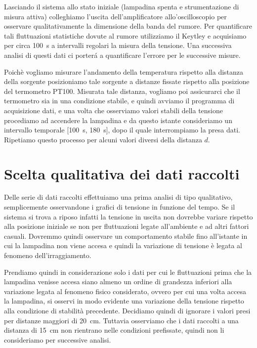 \documentclass[
    rmp,
    reprint, 
    superscriptaddress, 
    altaffilletter, 
    amsmath, 
    amssymb,
    a4paper]{revtex4-2}
\begin{document}
Lasciando il sistema allo stato iniziale (lampadina spenta e strumentazione di misura attiva) colleghiamo l'uscita dell'amplificatore allo'oscilloscopio per osservare qualitativamente la dimensione della banda del rumore. 
Per quantificare tali fluttuazioni statistiche dovute al rumore utilizziamo il Keytley e acquisiamo per circa \SI{100}{\second} a intervalli regolari la misura della tensione. Una successiva analisi di questi dati ci porter\'a a quantificare l'errore per le successive misure.

Poichè vogliamo misurare l'andamento della temperatura rispetto alla distanza della sorgente posizioniamo tale sorgente a distanze fissate rispetto alla posizione del termometro PT100. Misurata tale distanza, vogliamo poi assicurarci che il termometro sia in una condizione stabile, e quindi avviamo il programma di acquisizione dati, e una volta che osserviamo valori stabili della tensione procediamo ad accendere la lampadina e da questo istante consideriamo un intervallo temporale [\SI{100}{\second}, \SI{180}{\second}], dopo il quale interrompiamo la presa dati. Ripetiamo questo processo per alcuni valori diversi della distanza $d$.

\section*{Scelta qualitativa dei dati raccolti}
Delle serie di dati raccolti effettuiamo una prima analisi di tipo qualitativo, semplicemente osservandone i grafici di tensione in funzione del tempo. Se il sistema si trova a riposo infatti la tensione in uscita non dovrebbe variare rispetto alla posizione iniziale se non per fluttuazioni legate all'ambiente e ad altri fattori casuali. Dovremmo quindi osservare un comportamento stabile fino all'istante in cui la lampadina non viene accesa e quindi la variazione di tensione è legata al fenomeno dell'irraggiamento. 

Prendiamo quindi in considerazione solo i dati per cui le fluttuazioni prima che la lampadina venisse accesa siano almeno un ordine di grandezza inferiori alla variazione legata al fenomeno fisico considerato, ovvero per cui una volta accesa la lampadina, si osservi in modo evidente una variazione della tensione rispetto alla condizione di stabilità precedente. Decidiamo quindi di ignorare i valori presi per distanze maggiori di \SI{20}{\centi\metre}. Tuttavia  osserviamo che i dati raccolti a una distanza di \SI{15}{\centi\metre} non rientrano nelle condizioni prefissate, quindi non li consideriamo per successive analisi. 
\end{document}
